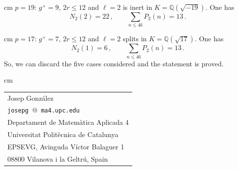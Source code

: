 \documentclass[a4paper,12pt]{article}
\theoremstyle{definition}
\theoremstyle{remark}
\numberwithin{equation}{section}
\newcommand{\Q}{\mathbb{Q}}
\begin{document}
 cm
{ $p=19$:} $g^+=9$,  $2r\leq 12$ and   $\ell=2$  is inert  in $K=\Q(\sqrt{-19})$. One has
$$N_2(2)=22\,,\qquad \sum_{n\leq 46 } P_2(n)=13\,.
$$


 cm
{ $p=17$:}  $g^+=7$,  $2r\leq 12$ and  $\ell=2$  splits in $K=\Q(\sqrt{17})$. One has
$$
N_2(1)=6\,,\quad\quad\sum_{n\leq 46}P_2(n)=13\,.
$$
So, we can discard the five cases considered and the statement is proved.







{}


 cm

\begin{tabular}{l}
Josep Gonz\'alez\\
\texttt{josepg\,\footnotesize{$@$}\,ma4.upc.edu}\\
Departament de Matem\`atica Aplicada 4  \\
Universitat Polit\`ecnica de Catalunya  \\
EPSEVG, Avinguda V\'ictor Balaguer 1\\
08800 Vilanova i la Geltr\'u, Spain\\[20pt]
\end{tabular}
\end{document}
